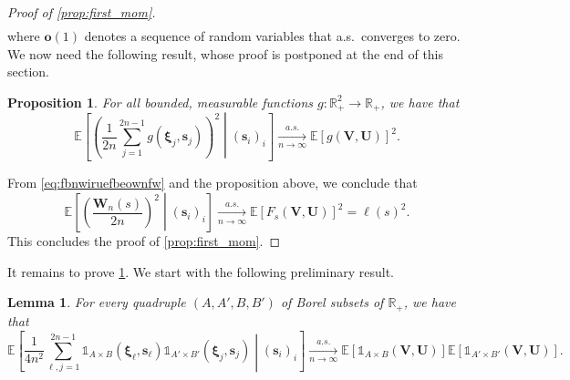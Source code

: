 \documentclass[11pt,a4paper,oneside]{article}
\newtheorem{prop}[thm]{Proposition}
\newtheorem{lem}[thm]{Lemma}
\theoremstyle{definition}
\theoremstyle{remark}
\def\E{\mathbb{E}}
\def\R{\mathbb{R}}
\begin{document}
\begin{proof}[Proof of \cref{prop:first_mom}]
\begin{multline}
\end{multline}
where $\bm o(1)$ denotes a sequence of random variables that a.s.\ converges to zero.
We now need the following result, whose proof is postponed at the end of this section.
\begin{prop} \label{prop:conv_for_bnd_cont_funct}
	For all bounded, measurable functions $g:\R^2_+\to\R_+$, we have that
	\begin{equation}\label{eq:second_mom_funct}
		\E\left[\left(\frac{1}{2n}\sum_{j=1}^{2n-1}g\left(\bm \xi_j,\bm s_j\right)\right)^2\middle| (\bm s_i)_i\right]\xrightarrow[n\to\infty]{a.s.}\E\left[g\left(\bm V,\bm U\right)\right]^2.
	\end{equation}
\end{prop}

From \cref{eq:fbnwiruefbeownfw} and the proposition above, we conclude that
\begin{equation}
\E\left[\left(\frac{\bm W_n(s)}{2n}\right)^2\middle| (\bm s_i)_i\right]\xrightarrow[n\to\infty]{a.s.}\E\left[F_s\left(\bm V,\bm U\right)\right]^2=\ell(s)^2.
\end{equation}
This concludes the proof of \cref{prop:first_mom}.
\end{proof}



It remains to prove \cref{prop:conv_for_bnd_cont_funct}. We start with the following preliminary result.


\begin{lem} \label{lem:first_sec_mom_for_ret}
For every quadruple $(A,A',B,B')$ of Borel subsets of $\R_+$, we have that
\begin{equation}
\E\left[\frac{1}{4n^2}\sum_{\ell,j=1}^{2n-1} \mathds{1}_{A \times B}\left(\bm \xi_\ell,\bm s_\ell\right) \mathds{1}_{A' \times B'}\left(\bm \xi_j,\bm s_j\right)\middle| (\bm s_i)_i\right]\xrightarrow[n\to\infty]{a.s.} \E\left[\mathds{1}_{A \times B}(\bm V,\bm U)\right]\E\left[\mathds{1}_{A' \times B'}(\bm V,\bm U)\right]\label{eq:second_mom_ind_ret}.
\end{equation}
\end{lem}
\end{document}
